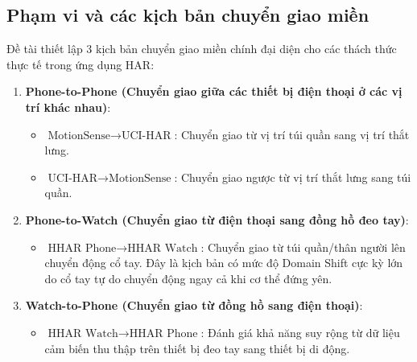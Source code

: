 \subsection{Phạm vi và các kịch bản chuyển giao miền}
Đề tài thiết lập 3 kịch bản chuyển giao miền chính đại diện cho các thách thức thực tế trong ứng dụng HAR:
\begin{enumerate}
    \item \textbf{Phone-to-Phone (Chuyển giao giữa các thiết bị điện thoại ở các vị trí khác nhau)}:
    \begin{itemize}
        \item $\text{MotionSense} \rightarrow \text{UCI-HAR}$: Chuyển giao từ vị trí túi quần sang vị trí thắt lưng.
        \item $\text{UCI-HAR} \rightarrow \text{MotionSense}$: Chuyển giao ngược từ vị trí thắt lưng sang túi quần.
    \end{itemize}
    \item \textbf{Phone-to-Watch (Chuyển giao từ điện thoại sang đồng hồ đeo tay)}:
    \begin{itemize}
        \item $\text{HHAR Phone} \rightarrow \text{HHAR Watch}$: Chuyển giao từ túi quần/thân người lên chuyển động cổ tay. Đây là kịch bản có mức độ Domain Shift cực kỳ lớn do cổ tay tự do chuyển động ngay cả khi cơ thể đứng yên.
    \end{itemize}
    \item \textbf{Watch-to-Phone (Chuyển giao từ đồng hồ sang điện thoại)}:
    \begin{itemize}
        \item $\text{HHAR Watch} \rightarrow \text{HHAR Phone}$: Đánh giá khả năng suy rộng từ dữ liệu cảm biến thu thập trên thiết bị đeo tay sang thiết bị di động.
    \end{itemize}
\end{enumerate}
